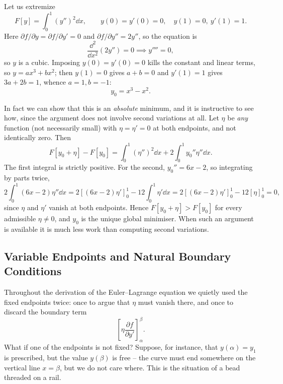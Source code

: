 \documentclass[a4paper]{scrartcl}
\begin{document}
\begin{example}
	Let us extremize
	$$
	F[y] = \int_0^1 (y'')^2 \dd x, \qquad y(0) = y'(0) = 0, \quad y(1) = 0, \ y'(1) = 1.
	$$
	Here $\partial f/\partial y = \partial f/\partial y' = 0$ and $\partial f/\partial y'' = 2y''$, so the equation is
	$$
	\frac{\dd^2}{\dd x^2}\left(2y''\right) = 0 \implies y'''' = 0,
	$$
	so $y$ is a cubic. Imposing $y(0) = y'(0) = 0$ kills the constant and linear terms, so $y = ax^3 + bx^2$; then $y(1) = 0$ gives $a + b = 0$ and $y'(1) = 1$ gives $3a + 2b = 1$, whence $a = 1, b = -1$:
	$$
	y_0 = x^3 - x^2.
	$$

	In fact we can show that this is an \emph{absolute} minimum, and it is instructive to see how, since the argument does not involve second variations at all. Let $\eta$ be \emph{any} function (not necessarily small) with $\eta = \eta' = 0$ at both endpoints, and not identically zero. Then
	$$
	F[y_0 + \eta] - F[y_0] = \int_0^1(\eta'')^2\dd x + 2\int_0^1 y_0''\eta''\dd x.
	$$
	The first integral is strictly positive. For the second, $y_0'' = 6x - 2$, so integrating by parts twice,
	$$
	2\int_0^1 (6x - 2)\eta''\dd x = 2\left[(6x-2)\eta'\right]_0^1 - 12\int_0^1 \eta'\dd x = 2\left[(6x-2)\eta'\right]_0^1 - 12\left[\eta\right]_0^1 = 0,
	$$
	since $\eta$ and $\eta'$ vanish at both endpoints. Hence $F[y_0 + \eta] > F[y_0]$ for every admissible $\eta \neq 0$, and $y_0$ is the unique global minimiser. When such an argument is available it is much less work than computing second variations.
\end{example}

\subsection{Variable Endpoints and Natural Boundary Conditions}\label{sec:naturalbc}

Throughout the derivation of the Euler--Lagrange equation we quietly used the fixed endpoints twice: once to argue that $\eta$ must vanish there, and once to discard the boundary term
$$
\left[\eta \frac{\partial f}{\partial y'}\right]_\alpha^\beta.
$$
What if one of the endpoints is not fixed? Suppose, for instance, that $y(\alpha) = y_1$ is prescribed, but the value $y(\beta)$ is free -- the curve must end somewhere on the vertical line $x = \beta$, but we do not care where. This is the situation of a bead threaded on a rail.
\end{document}
